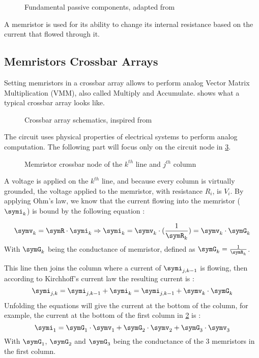 \begin{figure}[t]
  \centering
  
  \caption{Fundamental passive components, adapted from \cite{memWiki}}
  \label{fig:fundComp}
\end{figure}

A memristor is used for its ability to change its internal resistance based on the current that flowed through it.

\subsection{Memristors Crossbar Arrays}

Setting memristors in a crossbar array allows to perform analog Vector Matrix Multiplication (VMM), also called Multiply and Accumulate.  shows what a typical crossbar array looks like.

\begin{figure}[b]
  \centering
  
  \caption{Crossbar array schematics, inspired from \cite{xbarFigures}}
  \label{fig:crossbar}
\end{figure}

The circuit uses physical properties of electrical systems to perform analog computation. The following part will focus only on the circuit node in \cref{fig:crossNode}.

\begin{figure}[t]
  \centering
  
  \caption{Memristor crossbar node of the $k^{th}$ line and $j^{th}$ column}
  \label{fig:crossNode}
\end{figure}

A voltage is applied on the $k^{th}$ line, and because every column is virtually grounded, the voltage applied to the memristor, with resistance $R_i$, is $V_i$. By applying Ohm's law, we know that the current flowing into the memristor ($\symi_{k}$) is bound by the following equation :

\begin{equation}
  \symv_k = \symR\cdot \symi_{k} \Rightarrow \symi_{k} = \symv_k\cdot (\frac{1}{\symR_k})= \symv_k\cdot \symG_k
\end{equation}
With $ \symG_k$ being the conductance of memristor, defined as $ \symG_k=\frac{1}{\symR_k}$.

This line then joins the column where a current of $\symi_{j,k-1}$ is flowing, then according to Kirchhoff's current law the resulting current is :
\begin{equation}
  \symi_{j,k} = \symi_{j,k-1}+\symi_{k} = \symi_{j,k-1} + \symv_k\cdot \symG_k
\end{equation}
Unfolding the equations will give the current at the bottom of the column, for example, the current at the bottom of the first column in \cref{fig:crossbar} is :
\begin{equation}
  \symi_1= \symG_1\cdot \symv_1 +  \symG_2\cdot \symv_2 +  \symG_3\cdot \symv_3
\end{equation}
With $\symG_1$, $\symG_2$ and $\symG_3$ being the conductance of the 3 memristors in the first column.

